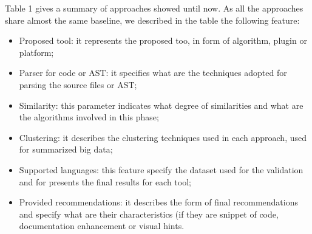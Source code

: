 Table 1 gives a summary of approaches showed until now. As all the approaches share almost the same baseline, we described in the table the following feature:
\begin{itemize}
\item Proposed tool: it represents the proposed too, in form of algorithm, plugin or platform;
\item Parser for code or AST: it specifies what are the techniques adopted for parsing the source files or AST;
\item Similarity: this parameter indicates what degree of similarities and what are the algorithms involved in this phase;
\item Clustering: it describes the clustering techniques used in each approach, used for summarized big data;
\item Supported languages: this feature specify the dataset used for the validation and for presents the final results for each tool;
\item Provided recommendations: it describes the form of final recommendations and specify what are their characteristics (if they are snippet of code, documentation enhancement or visual hints. 

\end{itemize} 

